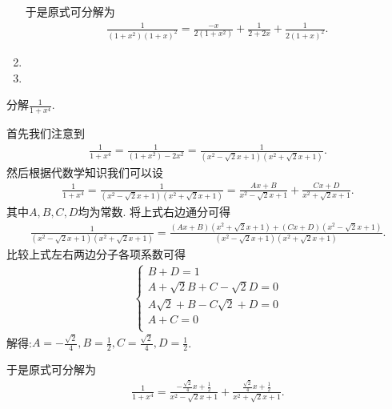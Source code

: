 \documentclass[../../main.tex]{subfiles}
\begin{document}
\begin{solution}
\begin{enumerate}
于是原式可分解为
\begin{align*}
\frac{1}{\left( 1+x^2 \right) \left( 1+x \right) ^2}=\frac{-x}{2\left( 1+x^2 \right)}+\frac{1}{2+2x}+\frac{1}{2\left( 1+x \right) ^2}.
\end{align*}

\item 

\item 
\end{enumerate}

\end{solution}

\begin{example}
分解$\frac{1}{1+x^4}$.
\end{example}
\begin{solution}
首先我们注意到
\begin{align*}
\frac{1}{1+x^4}=\frac{1}{\left( 1+x^2 \right) -2x^2}=\frac{1}{\left( x^2-\sqrt{2}x+1 \right) \left( x^2+\sqrt{2}x+1 \right)}.
\end{align*}
然后根据代数学知识我们可以设
\begin{align}\label{equation:little tech eq3}
\frac{1}{1+x^4}=\frac{1}{\left( x^2-\sqrt{2}x+1 \right) \left( x^2+\sqrt{2}x+1 \right)}=\frac{Ax+B}{x^2-\sqrt{2}x+1}+\frac{Cx+D}{x^2+\sqrt{2}x+1}.  
\end{align}
其中$A,B,C,D$均为常数.
将上式右边通分可得
\begin{align*}
\frac{1}{\left( x^2-\sqrt{2}x+1 \right) \left( x^2+\sqrt{2}x+1 \right)}=\frac{\left( Ax+B \right) \left( x^2+\sqrt{2}x+1 \right) +\left( Cx+D \right) \left( x^2-\sqrt{2}x+1 \right)}{\left( x^2-\sqrt{2}x+1 \right) \left( x^2+\sqrt{2}x+1 \right)}.
\end{align*}
比较上式左右两边分子各项系数可得
\begin{align*}
\begin{cases}
B+D=1\\
A+\sqrt{2}B+C-\sqrt{2}D=0\\
A\sqrt{2}+B-C\sqrt{2}+D=0\\
A+C=0\\
\end{cases}
\end{align*}
解得:$A=-\frac{\sqrt{2}}{4},B=\frac{1}{2},C=\frac{\sqrt{2}}{4},D=\frac{1}{2}$.

于是原式可分解为
\begin{align*}
\frac{1}{1+x^4}=\frac{-\frac{\sqrt{2}}{4}x+\frac{1}{2}}{x^2-\sqrt{2}x+1}+\frac{\frac{\sqrt{2}}{4}x+\frac{1}{2}}{x^2+\sqrt{2}x+1}.
\end{align*}

\end{solution}
\end{document}

